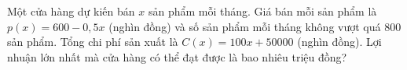 \begin{ex}
Một cửa hàng dự kiến bán $x$ sản phẩm mỗi tháng. Giá bán mỗi sản phẩm là $p(x)=600-0{,}5x$ (nghìn đồng) và số sản phẩm mỗi tháng không vượt quá $800$ sản phẩm. Tổng chi phí sản xuất là $C(x)=100x+50000$ (nghìn đồng). Lợi nhuận lớn nhất mà cửa hàng có thể đạt được là bao nhiêu triệu đồng?
\end{ex}
